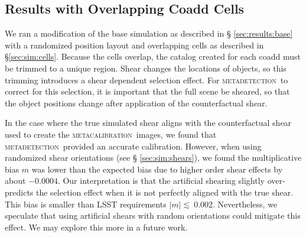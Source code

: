 \documentclass[twocolumn,twocolappendix,astrosym]{openjournal}
\newcommand{\snr}{$S/N$}
\newcommand{\Tratio}{$T/T_{PSF}$}
\newcommand{\mcal}{\textsc{metacalibration}}
\newcommand{\mdet}{\textsc{metadetection}}
\newcommand{\mthresh}{0.002}
\begin{document}
%
%



\subsection{Results with Overlapping Coadd Cells} \label{sec:results:cells}

We ran a modification of the base simulation as described in \S
\ref{sec:results:base} with a randomized position layout and overlapping cells
as described in \S \ref{sec:sim:cells}.  Because the cells overlap, the catalog
created for each coadd must be trimmed to a unique region.  Shear changes the
locations of objects, so this trimming introduces a shear dependent selection
effect.  For \mdet\ to correct for this selection, it is important that the
full scene be sheared, so that the object positions change after application of
the counterfactual shear.

In the case where the true simulated shear aligns with the counterfactual shear
used to create the \mcal\ images, we found that \mdet\ provided an accurate
calibration.  However, when using randomized shear orientations (see \S
\ref{sec:sim:shears}), we found the multiplicative bias $m$ was lower than the
expected bias due to higher order shear effects by about $-0.0004$.  Our
interpretation is that the artificial shearing slightly over-predicts the
selection effect when it is not perfectly aligned with the true shear.  This
bias is smaller than LSST requirements $|m|\lesssim~$\mthresh.  Nevertheless, we
speculate that using artificial shears with random orientations could mitigate
this effect.  We may explore this more in a future work.
\end{document}
